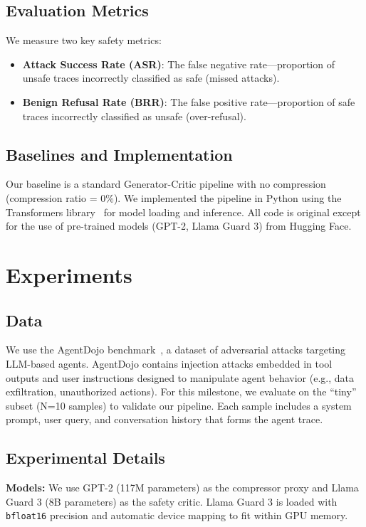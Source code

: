 \documentclass[11pt]{article}
\begin{document}
\subsection{Evaluation Metrics}
We measure two key safety metrics:
\begin{itemize}
    \item \textbf{Attack Success Rate (ASR)}: The false negative rate—proportion of unsafe traces incorrectly classified as safe (missed attacks).
    \item \textbf{Benign Refusal Rate (BRR)}: The false positive rate—proportion of safe traces incorrectly classified as unsafe (over-refusal).
\end{itemize}

\subsection{Baselines and Implementation}
Our baseline is a standard Generator-Critic pipeline with no compression (compression ratio = 0\%). We implemented the pipeline in Python using the Transformers library~\cite{wolf2020transformers} for model loading and inference. All code is original except for the use of pre-trained models (GPT-2, Llama Guard 3) from Hugging Face.

\section{Experiments}

\subsection{Data}
We use the AgentDojo benchmark~\cite{agentdojo}, a dataset of adversarial attacks targeting LLM-based agents. AgentDojo contains injection attacks embedded in tool outputs and user instructions designed to manipulate agent behavior (e.g., data exfiltration, unauthorized actions). For this milestone, we evaluate on the ``tiny'' subset (N=10 samples) to validate our pipeline. Each sample includes a system prompt, user query, and conversation history that forms the agent trace.

\subsection{Experimental Details}
\textbf{Models:} We use GPT-2 (117M parameters) as the compressor proxy and Llama Guard 3 (8B parameters) as the safety critic. Llama Guard 3 is loaded with \texttt{bfloat16} precision and automatic device mapping to fit within GPU memory. \newline
\end{document}
